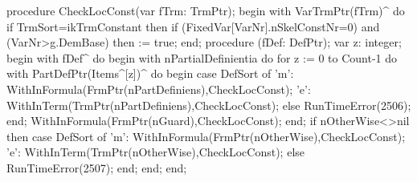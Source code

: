 \nwenddocs{}\endmoddef\nwstartdeflinemarkup{}\nwenddeflinemarkup
procedure CheckLocConst(var fTrm: TrmPtr);
begin
   with VarTrmPtr(fTrm)^ do
      if TrmSort=ikTrmConstant then
         if (FixedVar[VarNr].nSkelConstNr=0) and (VarNr>g.DemBase) then
             := true;
end;
\eatline
{}\nwendcode{}\nwdocspar
\nwenddocs{}\endmoddef\nwstartdeflinemarkup{}\nwenddeflinemarkup
procedure (fDef: DefPtr);
var
   z: integer;
begin
   with fDef^ do
   begin
      with nPartialDefinientia do
         for z := 0 to Count-1 do
            with PartDefPtr(Items^[z])^ do
         begin
            case DefSort of
               'm': WithInFormula(FrmPtr(nPartDefiniens),CheckLocConst);
               'e': WithInTerm(TrmPtr(nPartDefiniens),CheckLocConst);
               else RunTimeError(2506);
            end;
            WithInFormula(FrmPtr(nGuard),CheckLocConst);
         end;
      if nOtherWise<>nil then
         case DefSort of
            'm': WithInFormula(FrmPtr(nOtherWise),CheckLocConst);
            'e': WithInTerm(TrmPtr(nOtherWise),CheckLocConst);
            else RunTimeError(2507);
         end;
   end;
end;
\eatline
{}\nwendcode{}\nwdocspar
\nwenddocs{}\endmoddef\nwstartdeflinemarkup{}\nwenddeflinemarkup

